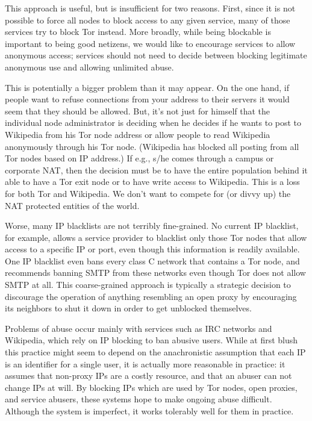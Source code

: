 \documentclass{llncs}
\begin{document}
This approach is useful, but is insufficient for two reasons.  First, since
it is not possible to force all nodes to block access to any given service,
many of those services try to block Tor instead.  More broadly, while being
blockable is important to being good netizens, we would like to encourage
services to allow anonymous access; services should not need to decide
between blocking legitimate anonymous use and allowing unlimited abuse.

This is potentially a bigger problem than it may appear. 
On the one hand, if people want to refuse connections from your address to
their servers it would seem that they should be allowed.  But, it's not just
for himself that the individual node administrator is deciding when he decides
if he wants to post to Wikipedia from his Tor node address or allow
people to read Wikipedia anonymously through his Tor node. (Wikipedia
has blocked all posting from all Tor nodes based on IP address.) If e.g.,
s/he comes through a campus or corporate NAT, then the decision must
be to have the entire population behind it able to have a Tor exit
node or to have write access to Wikipedia. This is a loss for both Tor
and Wikipedia. We don't want to compete for (or divvy up) the NAT
protected entities of the world.

Worse, many IP blacklists are not terribly fine-grained.
No current IP blacklist, for example, allows a service provider to blacklist
only those Tor nodes that allow access to a specific IP or port, even
though this information is readily available.  One IP blacklist even bans
every class C network that contains a Tor node, and recommends banning SMTP
from these networks even though Tor does not allow SMTP at all.  This
coarse-grained approach is typically a strategic decision to discourage the
operation of anything resembling an open proxy by encouraging its neighbors
to shut it down in order to get unblocked themselves.

Problems of abuse occur mainly with services such as IRC networks and
Wikipedia, which rely on IP blocking to ban abusive users.  While at first
blush this practice might seem to depend on the anachronistic assumption that
each IP is an identifier for a single user, it is actually more reasonable in
practice: it assumes that non-proxy IPs are a costly resource, and that an
abuser can not change IPs at will.  By blocking IPs which are used by Tor
nodes, open proxies, and service abusers, these systems hope to make
ongoing abuse difficult.  Although the system is imperfect, it works
tolerably well for them in practice.
\end{document}
